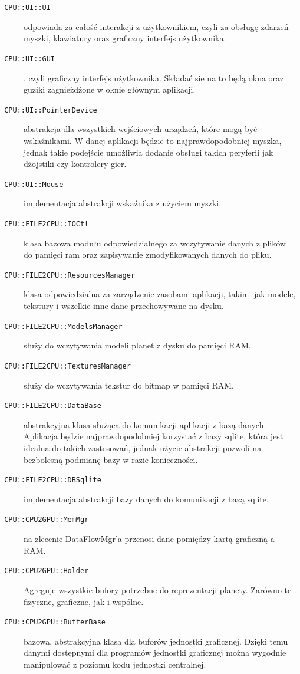 \begin{description}
\item[]
\item[\texttt{ CPU::UI::UI}] odpowiada za całość interakcji z użytkownikiem, czyli za obsługę zdarzeń myszki, klawiatury oraz graficzny interfejs użytkownika.
\item[\texttt{ CPU::UI::GUI}], czyli graficzny interfejs użytkownika. Składać sie na to będą okna oraz guziki zagnieżdżone w oknie głównym aplikacji.
\item[\texttt{ CPU::UI::PointerDevice}] abstrakcja dla wszystkich wejściowych urządzeń, które mogą być wskaźnikami. W danej aplikacji będzie to najprawdopodobniej myszka, jednak takie podejście umożliwia dodanie obsługi takich peryferii jak dżojstiki czy kontrolery gier.
\item[\texttt{ CPU::UI::Mouse}] implementacja abstrakcji wskaźnika z użyciem myszki.
\item[]
\item[\texttt{ CPU::FILE2CPU::IOCtl}] klasa bazowa modułu odpowiedzialnego za wczytywanie danych z plików do pamięci ram oraz zapisywanie zmodyfikowanych danych do pliku.
\item[\texttt{ CPU::FILE2CPU::ResourcesManager}] klasa odpowiedzialna za zarządzenie zasobami aplikacji, takimi jak modele, tekstury i wszelkie inne dane przechowywane na dysku.
\item[\texttt{ CPU::FILE2CPU::ModelsManager}] służy do wczytywania modeli planet z dysku do pamięci RAM.
\item[\texttt{ CPU::FILE2CPU::TexturesManager}] służy do wczytywania tekstur do bitmap w pamięci RAM.
\item[\texttt{ CPU::FILE2CPU::DataBase}] abstrakcyjna klasa służąca do komunikacji aplikacji z bazą danych. Aplikacja będzie najprawdopodobniej korzystać z bazy sqlite, która jest idealna do takich zastosowań, jednak użycie abstrakcji pozwoli na bezbolesną podmianę bazy w razie konieczności.
\item[\texttt{ CPU::FILE2CPU::DBSqlite}] implementacja abstrakcji bazy danych do komunikacji z bazą sqlite.
\item[]
\item[\texttt{ CPU::CPU2GPU::MemMgr}] na zlecenie DataFlowMgr'a przenosi dane pomiędzy kartą graficzną a RAM.
\item[\texttt{ CPU::CPU2GPU::Holder}] Agreguje wszystkie bufory potrzebne do reprezentacji planety. Zarówno te fizyczne, graficzne, jak i wspólne.
\item[\texttt{ CPU::CPU2GPU::BufferBase}] bazowa, abstrakcyjna klasa dla buforów jednostki graficznej. Dzięki temu danymi dostępnymi dla programów jednostki graficznej można wygodnie manipulować z poziomu kodu jednostki centralnej.

\end{description}
